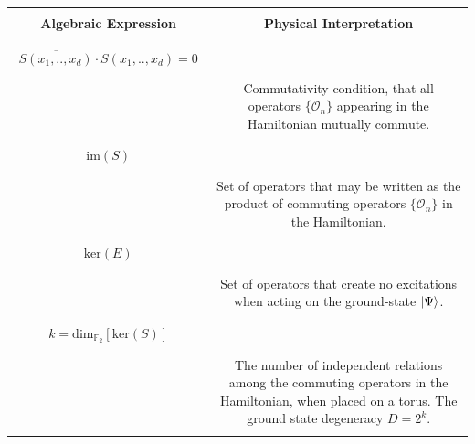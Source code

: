 \documentclass[aps,twocolumn,preprintnumbers,floatfix,showpacs,prx]{revtex4-1}
\begin{document}
\begin{table}
  \begin{tabular}{|c|c|}
  \hline & \\
  {\bf Algebraic Expression} & {\bf \,\,\,Physical Interpretation\,\,\,}\\ & \\
  \hhline{|=|=|} & \\
  $\begin{array}{c}\overline{S(x_{1},..,x_{d})}\cdot S(x_{1},..,x_{d}) = 0 \\\end{array}$ & \\ & \parbox[c]{4cm}{\vspace{-1.1\baselineskip}\raggedright Commutativity condition, that all operators $\{\mathcal{O}_{n}\}$ appearing in the Hamiltonian mutually commute.}  \\ & \\
  \hline & \\
$\begin{array}{c}\mathrm{im}(S)\\\end{array}$ & \\ & \parbox[c]{4cm}{\vspace{-1.1\baselineskip}\raggedright Set of operators that may be written as the product of  commuting operators $\{\mathcal{O}_{n}\}$ in the Hamiltonian.}  \\ & \\
    \hline & \\
   $\begin{array}{c}\mathrm{ker}(E)\\\end{array}$ & \\ & \parbox[c]{4cm}{\vspace{-1.1\baselineskip}\raggedright Set of operators that create no excitations when acting on the ground-state $\ket{\Psi}$.} \\ & \\
   \hline &\\
   $\begin{array}{c} k = \mathrm{dim}_{\mathbb{F}_{2}}[\mathrm{ker}(S)]\\\end{array}$ & \\ & \parbox[c]{4cm}{\vspace{-1.1\baselineskip}\raggedright The number of independent relations among the commuting operators in the Hamiltonian, when placed on a torus. The ground state degeneracy $D = 2^{k}$.} \\ & \\

\end{tabular}
\end{table}
\end{document}
